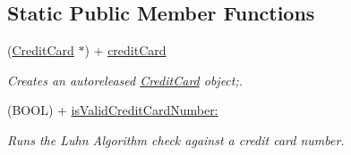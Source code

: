 \subsection*{Static Public Member Functions}
\begin{DoxyCompactItemize}
\item 
(\hyperlink{interface_credit_card}{CreditCard} $\ast$) + \hyperlink{interface_credit_card_a3a5164577d3cdb01fb78b8acd7a92be1}{creditCard}
\begin{DoxyCompactList}\small\item\em Creates an autoreleased \hyperlink{interface_credit_card}{CreditCard} object;. \item\end{DoxyCompactList}\item 
(BOOL) + \hyperlink{interface_credit_card_a55d3f288d976515cf0bd05bdd288d42e}{isValidCreditCardNumber:}
\begin{DoxyCompactList}\small\item\em Runs the Luhn Algorithm check against a credit card number. \item\end{DoxyCompactList}\end{DoxyCompactItemize}
